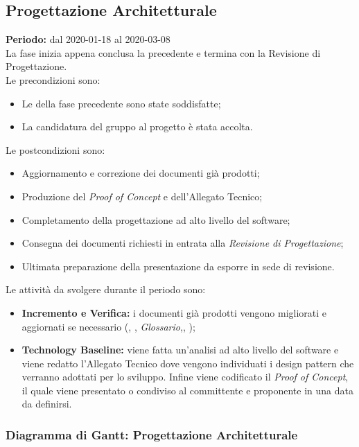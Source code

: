 \subsection{Progettazione Architetturale}
\label{progettazione_architetturale}
\textbf{Periodo:} dal 2020-01-18 al 2020-03-08
\\La fase inizia appena conclusa la precedente e termina con la Revisione di Progettazione.
\\Le precondizioni sono:

\begin{itemize}
    \item Le  della fase precedente sono state soddisfatte;
    \item La candidatura del gruppo al progetto {\NomeProgetto} è stata accolta.
\end{itemize}
    Le postcondizioni sono:
\begin{itemize}
    \item Aggiornamento e correzione dei documenti già prodotti;
    \item Produzione del \textit{Proof of Concept} e dell'Allegato Tecnico;
    \item Completamento della progettazione ad alto livello del software;
    \item Consegna dei documenti richiesti in entrata alla \textit{Revisione di Progettazione};
    \item Ultimata preparazione della presentazione da esporre in sede di revisione.
\end{itemize}

Le attività da svolgere durante il periodo sono:
\begin{itemize}
    \item \textbf{Incremento e Verifica:} i documenti già prodotti vengono migliorati e aggiornati se necessario (\textit{\NdP}, \textit{\PdP}, \textit{Glossario},\textit{\PdQ}, \textit{\AdR});
    \item \textbf{Technology Baseline:} viene fatta un'analisi ad alto livello del software e viene redatto l'Allegato Tecnico dove vengono individuati i design pattern che verranno adottati per lo sviluppo. Infine viene codificato il \textit{Proof of Concept}, il quale viene presentato o condiviso al committente e proponente in una data da definirsi.
\end{itemize}

\subsubsection{Diagramma di Gantt: Progettazione Architetturale}
